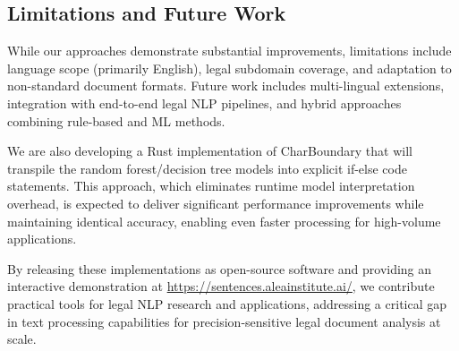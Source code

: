 \subsection{Limitations and Future Work}
While our approaches demonstrate substantial improvements, limitations include language scope (primarily English), legal subdomain coverage, and adaptation to non-standard document formats. Future work includes multi-lingual extensions, integration with end-to-end legal NLP pipelines, and hybrid approaches combining rule-based and ML methods.

We are also developing a Rust implementation of CharBoundary that will transpile the random forest/decision tree models into explicit if-else code statements. This approach, which eliminates runtime model interpretation overhead, is expected to deliver significant performance improvements while maintaining identical accuracy, enabling even faster processing for high-volume applications.

By releasing these implementations as open-source software and providing an interactive demonstration at \url{https://sentences.aleainstitute.ai/}, we contribute practical tools for legal NLP research and applications, addressing a critical gap in text processing capabilities for precision-sensitive legal document analysis at scale.

